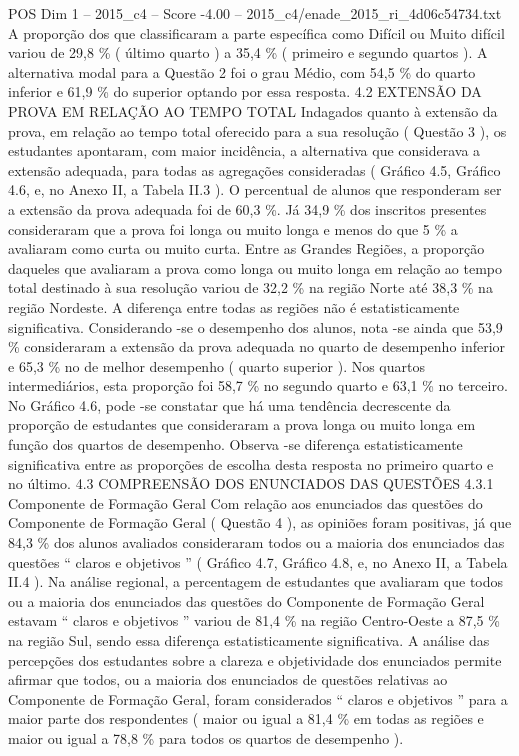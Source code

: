 \begin{textsample}{POS Dim 1 – 2015\_c4 – Score -4.00 – 2015\_c4/enade\_2015\_ri\_4d06c54734.txt}
A proporção dos que classificaram a parte específica como Difícil ou Muito difícil variou de 29,8 \% ( último quarto ) a 35,4 \% ( primeiro e segundo quartos ).
A alternativa modal para a Questão 2 foi o grau Médio, com 54,5 \% do quarto inferior e 61,9 \% do superior optando por essa resposta. 4.2 EXTENSÃO DA PROVA EM RELAÇÃO AO TEMPO TOTAL Indagados quanto à extensão da prova, em relação ao tempo total oferecido para a sua resolução ( Questão 3 ), os estudantes apontaram, com maior incidência, a alternativa que considerava a extensão adequada, para todas as agregações consideradas ( Gráfico 4.5, Gráfico 4.6, e, no Anexo II, a Tabela II.3 ).
O percentual de alunos que responderam ser a extensão da prova adequada foi de 60,3 \%.
Já 34,9 \% dos inscritos presentes consideraram que a prova foi longa ou muito longa e menos do que 5 \% a avaliaram como curta ou muito curta.
Entre as Grandes Regiões, a proporção daqueles que avaliaram a prova como longa ou muito longa em relação ao tempo total destinado à sua resolução variou de 32,2 \% na região Norte até 38,3 \% na região Nordeste.
A diferença entre todas as regiões não é estatisticamente significativa.
Considerando -se o desempenho dos alunos, nota -se ainda que 53,9 \% consideraram a extensão da prova adequada no quarto de desempenho inferior e 65,3 \% no de melhor desempenho ( quarto superior ).
Nos quartos intermediários, esta proporção foi 58,7 \% no segundo quarto e 63,1 \% no terceiro.
No Gráfico 4.6, pode -se constatar que há uma tendência decrescente da proporção de estudantes que consideraram a prova longa ou muito longa em função dos quartos de desempenho.
Observa -se diferença estatisticamente significativa entre as proporções de escolha desta resposta no primeiro quarto e no último. 4.3 COMPREENSÃO DOS ENUNCIADOS DAS QUESTÕES 4.3.1 Componente de Formação Geral Com relação aos enunciados das questões do Componente de Formação Geral ( Questão 4 ), as opiniões foram positivas, já que 84,3 \% dos alunos avaliados consideraram todos ou a maioria dos enunciados das questões “ claros e objetivos ” ( Gráfico 4.7, Gráfico 4.8, e, no Anexo II, a Tabela II.4 ).
Na análise regional, a percentagem de estudantes que avaliaram que todos ou a maioria dos enunciados das questões do Componente de Formação Geral estavam “ claros e objetivos ” variou de 81,4 \% na região Centro-Oeste a 87,5 \% na região Sul, sendo essa diferença estatisticamente significativa.
A análise das percepções dos estudantes sobre a clareza e objetividade dos enunciados permite afirmar que todos, ou a maioria dos enunciados de questões relativas ao Componente de Formação Geral, foram considerados “ claros e objetivos ” para a maior parte dos respondentes ( maior ou igual a 81,4 \% em todas as regiões e maior ou igual a 78,8 \% para todos os quartos de desempenho ).

\end{textsample}
